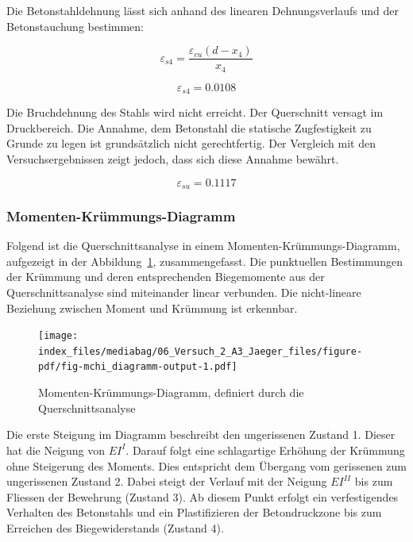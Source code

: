 \documentclass[
  12pt,
  letterpaper,
  egregdoesnotlikesansseriftitles]{scrreprt}
\begin{document}
Die Betonstahldehnung lässt sich anhand des linearen Dehnungsverlaufs
und der Betonstauchung bestimmen:

\begin{equation}\varepsilon_{s4} = \frac{\varepsilon_{cu} \left(d - x_{4}\right)}{x_{4}}\end{equation}

\begin{equation}\varepsilon_{s4} = 0.0108\end{equation}

Die Bruchdehnung des Stahls wird nicht erreicht. Der Querschnitt versagt
im Druckbereich. Die Annahme, dem Betonstahl die statische Zugfestigkeit
zu Grunde zu legen ist grundsätzlich nicht gerechtfertig. Der Vergleich
mit den Versuchsergebnissen zeigt jedoch, dass sich diese Annahme
bewährt.

\begin{equation}\varepsilon_{su} = 0.1117\end{equation}

\hypertarget{momenten-kruxfcmmungs-diagramm}{%
\subsubsection{Momenten-Krümmungs-Diagramm}\label{momenten-kruxfcmmungs-diagramm}}

Folgend ist die Querschnittsanalyse in einem
Momenten-Krümmungs-Diagramm, aufgezeigt in der
Abbildung~\ref{fig-mchi_diagramm}, zusammengefasst. Die punktuellen
Bestimmungen der Krümmung und deren entsprechenden Biegemomente aus der
Querschnittsanalyse sind miteinander linear verbunden. Die nicht-lineare
Beziehung zwischen Moment und Krümmung ist erkennbar.

\begin{figure}[H]

{\centering \texttt{[image: index\_files/mediabag/06\_Versuch\_2\_A3\_Jaeger\_files/figure-pdf/fig-mchi\_diagramm-output-1.pdf]}

}

\caption{\label{fig-mchi_diagramm}Momenten-Krümmungs-Diagramm, definiert
durch die Querschnittsanalyse}

\end{figure}

Die erste Steigung im Diagramm beschreibt den ungerissenen Zustand 1.
Dieser hat die Neigung von \(EI^I\). Darauf folgt eine schlagartige
Erhöhung der Krümmung ohne Steigerung des Moments. Dies entspricht dem
Übergang vom gerissenen zum ungerissenen Zustand 2. Dabei steigt der
Verlauf mit der Neigung \(EI^{II}\) bis zum Fliessen der Bewehrung
(Zustand 3). Ab diesem Punkt erfolgt ein verfestigendes Verhalten des
Betonstahls und ein Plastifizieren der Betondruckzone bis zum Erreichen
des Biegewiderstands (Zustand 4).
\end{document}
